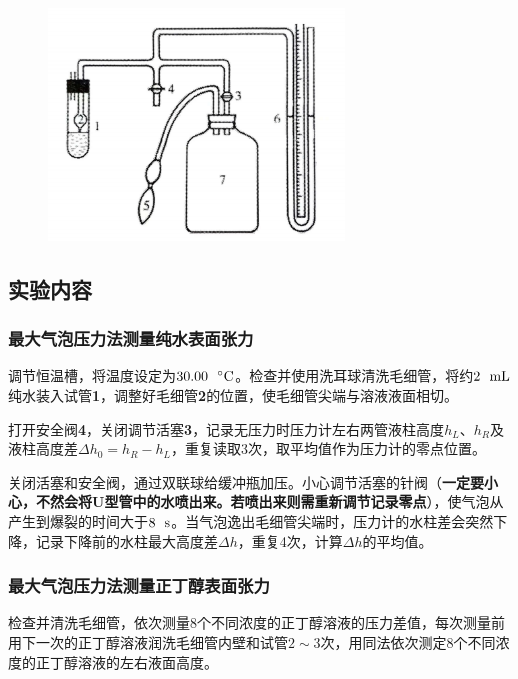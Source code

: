 \documentclass[12pt]{article}
\begin{document}
			\begin{figure}[h]
				\centering
				\includegraphics[width=0.70\textwidth]{2.png}
			\end{figure}

    	 \subsection{实验内容\citealp{physchemlab}}
			\subsubsection{最大气泡压力法测量纯水表面张力}
			调节恒温槽，将温度设定为$30.00\ \ {\rm ^{\circ}C}$。检查并使用洗耳球清洗毛细管，将约$2 \ \ {\rm mL}$纯水装入试管\textbf{1}，调整好毛细管\textbf{2}的位置，使毛细管尖端与溶液液面相切。\par 
			打开安全阀\textbf{4}，关闭调节活塞\textbf{3}，记录无压力时压力计左右两管液柱高度$h_{L}$、$h_{R}$及液柱高度差$\Delta h_{0}=h_{R}-h_{L}$，重复读取3次，取平均值作为压力计的零点位置。\par 
			关闭活塞和安全阀，通过双联球给缓冲瓶加压。小心调节活塞的针阀（\textbf{一定要小心，不然会将U型管中的水喷出来。若喷出来则需重新调节记录零点}），使气泡从产生到爆裂的时间大于$8\ \ {\rm s}$。当气泡逸出毛细管尖端时，压力计的水柱差会突然下降，记录下降前的水柱最大高度差$\Delta h$，重复4次，计算$\Delta h$的平均值。
			\subsubsection{最大气泡压力法测量正丁醇表面张力}
			检查并清洗毛细管，依次测量8个不同浓度的正丁醇溶液的压力差值，每次测量前用下一次的正丁醇溶液润洗毛细管内壁和试管$2\sim 3$次，用同法依次测定8个不同浓度的正丁醇溶液的左右液面高度。
				
\end{document}

